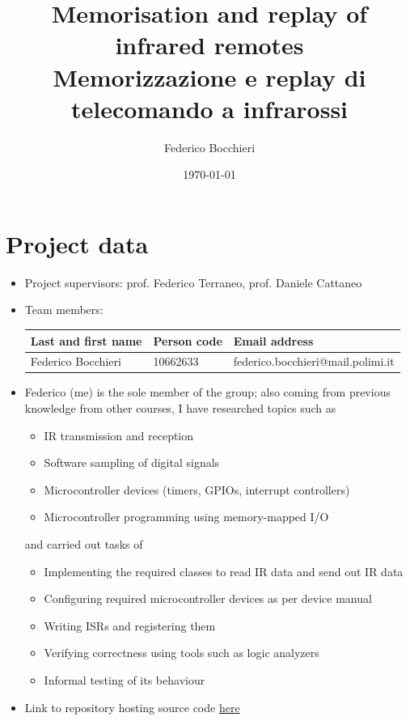 \documentclass[10pt,a4]{article}
\author{Federico Bocchieri}
\date{\today}
\title{Memorisation and replay of infrared remotes \\ [0.3cm] \Large Memorizzazione e replay di telecomando a infrarossi}
\begin{document}
\maketitle
\tableofcontents

\section{Project data}

\begin{itemize}
\item Project supervisors: prof. Federico Terraneo, prof. Daniele Cattaneo

\item Team members:
\begin{center}
\begin{tabular}{lll}
Last and first name & Person code & Email address\\
\hline
Federico Bocchieri & 10662633 & federico.bocchieri@mail.polimi.it
\end{tabular}
\end{center}

\item Federico (me) is the sole member of the group; also coming from previous knowledge from other courses, I have researched topics such as
\begin{itemize}
\item IR transmission and reception
\item Software sampling of digital signals
\item Microcontroller devices (timers, GPIOs, interrupt controllers)
\item Microcontroller programming using memory-mapped I/O
\end{itemize}
and carried out tasks of
\begin{itemize}
\item Implementing the required classes to read IR data and send out IR data
\item Configuring required microcontroller devices as per device manual
\item Writing ISRs and registering them
\item Verifying correctness using tools such as logic analyzers
\item Informal testing of its behaviour
\end{itemize}

\item Link to repository hosting source code \href{https://github.com/blvckmvgicdotexe/AOS_ES_Project}{here}
\end{itemize}
\end{document}
